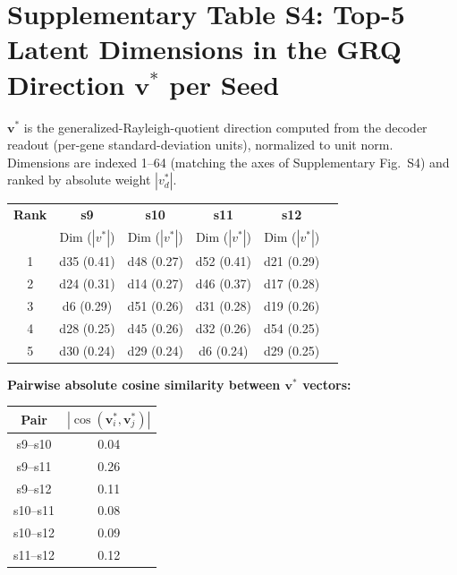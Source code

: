 \documentclass[11pt,a4paper]{article}
\begin{document}
\section*{Supplementary Table S4: Top-5 Latent Dimensions in the GRQ Direction $\mathbf{v}^*$ per Seed}
\label{tab:s4_grq_weights}

$\mathbf{v}^*$ is the generalized-Rayleigh-quotient direction computed from the decoder readout (per-gene standard-deviation units), normalized to unit norm. Dimensions are indexed 1--64 (matching the axes of Supplementary Fig.~S4) and ranked by absolute weight $|v^*_d|$.

\vspace{0.5cm}
\begin{tabular}{cccccc}
\toprule
\textbf{Rank} & \textbf{s9} & \textbf{s10} & \textbf{s11} & \textbf{s12} \\
 & Dim ($|v^*|$) & Dim ($|v^*|$) & Dim ($|v^*|$) & Dim ($|v^*|$) \\
\midrule
1 & d35 (0.41) & d48 (0.27) & d52 (0.41) & d21 (0.29) \\
2 & d24 (0.31) & d14 (0.27) & d46 (0.37) & d17 (0.28) \\
3 & d6 (0.29)  & d51 (0.26) & d31 (0.28) & d19 (0.26) \\
4 & d28 (0.25) & d45 (0.26) & d32 (0.26) & d54 (0.25) \\
5 & d30 (0.24) & d29 (0.24) & d6 (0.24)  & d29 (0.25) \\
\bottomrule
\end{tabular}

\vspace{0.5cm}
\textbf{Pairwise absolute cosine similarity between $\mathbf{v}^*$ vectors:}
\begin{center}
\begin{tabular}{cc}
\toprule
Pair & $|\cos(\mathbf{v}^*_i, \mathbf{v}^*_j)|$ \\
\midrule
s9--s10 & 0.04 \\
s9--s11 & 0.26 \\
s9--s12 & 0.11 \\
s10--s11 & 0.08 \\
s10--s12 & 0.09 \\
s11--s12 & 0.12 \\
\bottomrule
\end{tabular}
\end{center}
\end{document}
